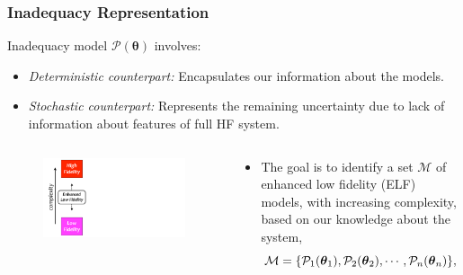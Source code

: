 \documentclass[10pt,xcolor=dvipsnames,compress]{beamer}
\begin{document}
\begin{frame}
\frametitle{Inadequacy Representation}
\vfill


Inadequacy model $\mathcal{P}(\boldsymbol{\theta})$ involves:
\begin{itemize}
\item \textit{Deterministic counterpart:}
Encapsulates our information about the models.

\item \textit{Stochastic counterpart:}
Represents the remaining uncertainty due to lack of information about features of full HF system.
\end{itemize}

\begin{columns}
\begin{figure}[h]
    \centering
    \includegraphics[trim = 0.in 0.in 9.in 0in, clip, width=1\textwidth]{figs/ELFmodel.pdf} 
\end{figure}


\begin{block}{}

\begin{itemize}
\item The goal is to identify a set $\mathcal{M}$ of enhanced low fidelity (ELF) models, with increasing complexity,  based on our knowledge about the system, 
\vspace{-0.1in}
\begin{equation*}
\mathcal{M} = \{\mathcal{P}_1(\boldsymbol{\theta}_1), \mathcal{P}_2(\boldsymbol{\theta}_2), \cdots, \mathcal{P}_n(\boldsymbol{\theta}_n)  \},
\vspace{-0.1in}
\end{equation*}


\end{itemize}
\end{block}
\end{columns}
\end{frame}
\end{document}
